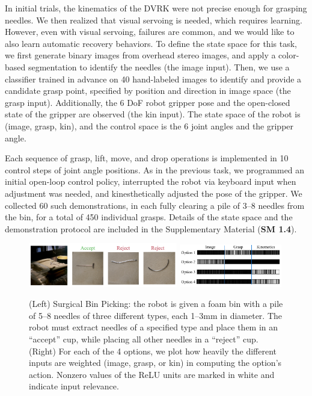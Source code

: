 In initial trials, the kinematics of the DVRK were not precise enough for grasping needles.
We then realized that visual servoing is needed, which requires learning.
However, even with visual servoing, failures are common, and we would like to also learn automatic recovery behaviors. 
To define the state space for this task, we first generate binary images from overhead stereo images, and apply a color-based segmentation to identify the needles (the \textsf{image} input).
Then, we use a classifier trained in advance on 40 hand-labeled images to identify and provide a candidate grasp point, specified by position and direction in image space (the \textsf{grasp} input). 
Additionally, the 6 DoF robot gripper pose and the open-closed state of the gripper are observed (the \textsf{kin} input).
The state space of the robot is (\textsf{image}, \textsf{grasp}, \textsf{kin}), and the control space is the 6 joint angles and the gripper angle.

Each sequence of grasp, lift, move, and drop operations is implemented in 10 control steps of joint angle positions.
As in the previous task,  we programmed an initial open-loop control policy, interrupted the robot via keyboard input when adjustment was needed, and kinesthetically adjusted the pose of the gripper. 
We collected 60 such demonstrations, in each fully clearing a pile of 3--8 needles from the bin, for a total of 450 individual grasps.
Details of the state space and the demonstration protocol are included in the Supplementary Material (\textbf{SM 1.4}).


\begin{figure}\vspace{-2em}
    \includegraphics[width=0.58\textwidth]{ddco-experiments/needle-sorting2.png}
    \includegraphics[width=0.4\textwidth]{ddco-experiments/ReLU-dvrk-options.png}
    \caption{(Left) Surgical Bin Picking: the robot is given a foam bin with a pile of 5--8 needles of three different types, each 1--3mm in diameter. The robot must extract needles of a specified type and place them in an ``accept'' cup, while placing all other needles in a ``reject'' cup. (Right) For each of the 4 options, we plot how heavily the different inputs are weighted (\textsf{image}, \textsf{grasp}, or \textsf{kin}) in computing the option's action. Nonzero values of the ReLU units are marked in white and indicate input relevance. \label{fig:dvrkexp4}} 
\end{figure}


